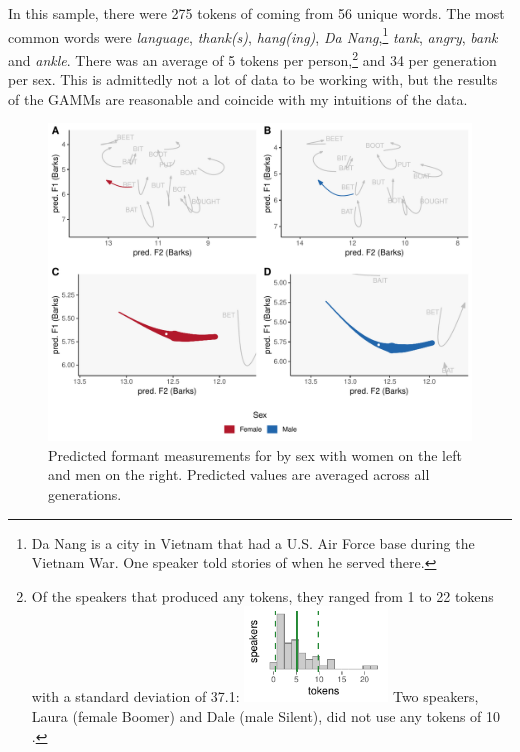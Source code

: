 In this sample, there were 275 tokens of \bang coming from 56 unique words. The most common words were \textit{language}, \textit{thank(s)}, \textit{hang(ing)}, \textit{Da Nang},\footnote{Da Nang is a city in Vietnam that had a U.S. Air Force base during the Vietnam War. One speaker told stories of when he served there.} \textit{tank}, \textit{angry}, \textit{bank} and \textit{ankle}. There was an average of 5 tokens per person,\footnote{Of the speakers that produced any \bang tokens, they ranged from 1 to 22 tokens with a standard deviation of 37.1: \includegraphics[width = 1.5in]{Figures/BANG/BANG_tiny.pdf} Two speakers, Laura (female Boomer) and Dale (male Silent), did not use any tokens of 10 \bang.} and 34 per generation per sex. This is admittedly not a lot of data to be working with, but the results of the GAMMs are reasonable and coincide with my intuitions of the data.

\begin{figure}[tb!]
    \centering
    \includegraphics[width = 6.5in]{Figures/BANG/BANG_four_panel_plot_summarized.pdf}
    \caption[Predicted formant measurements for \bang by sex.]{Predicted formant measurements for \bang by sex with women on the left and men on the right. Predicted values are averaged across all generations.}
    \label{fig:BANG_four_panel_plot_summarized}
\end{figure}

